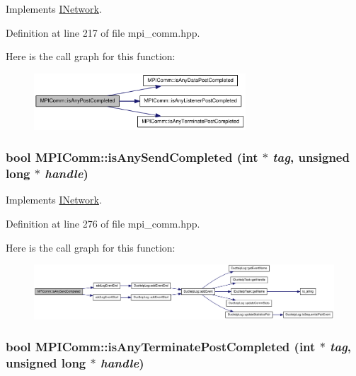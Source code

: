 Implements \hyperlink{class_i_network_a9e465b7489fd53410d3cb9ed532c4894}{INetwork}.

Definition at line 217 of file mpi\_\-comm.hpp.

Here is the call graph for this function:\nopagebreak
\begin{figure}[H]
\begin{center}
\leavevmode
\includegraphics[width=224pt]{class_m_p_i_comm_a897fbe8d99735dec4088197b9c4f2a23_cgraph}
\end{center}
\end{figure}
\hypertarget{class_m_p_i_comm_ab56666a8c492a8d53065def42a488d72}{
\subsubsection[{isAnySendCompleted}]{\setlength{\rightskip}{0pt plus 5cm}bool MPIComm::isAnySendCompleted (int $\ast$ {\em tag}, \/  unsigned long $\ast$ {\em handle})}}
\label{class_m_p_i_comm_ab56666a8c492a8d53065def42a488d72}


Implements \hyperlink{class_i_network_a4cf6eb047a7d028c3c4c023b59293061}{INetwork}.

Definition at line 276 of file mpi\_\-comm.hpp.

Here is the call graph for this function:\nopagebreak
\begin{figure}[H]
\begin{center}
\leavevmode
\includegraphics[width=420pt]{class_m_p_i_comm_ab56666a8c492a8d53065def42a488d72_cgraph}
\end{center}
\end{figure}
\hypertarget{class_m_p_i_comm_a0e84bad56ed23e721626ac1273a90670}{
\subsubsection[{isAnyTerminatePostCompleted}]{\setlength{\rightskip}{0pt plus 5cm}bool MPIComm::isAnyTerminatePostCompleted (int $\ast$ {\em tag}, \/  unsigned long $\ast$ {\em handle})}}
\label{class_m_p_i_comm_a0e84bad56ed23e721626ac1273a90670}


